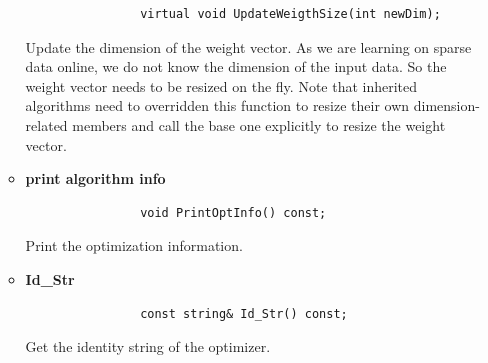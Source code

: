 \documentclass[11pt,a4paper]{article}
\newlength{\wideitemsep}
\let\olditem\item
\renewcommand{\item}{\setlength{\itemsep}{\wideitemsep}\olditem}
\begin{document}
\begin{enumerate}
\begin{itemize}
                \lstset{language=C++}
                \begin{lstlisting}
                virtual void UpdateWeigthSize(int newDim);
                \end{lstlisting}

                Update the dimension of the weight vector. As we are learning
                on sparse data online, we do not know the dimension of the
                input data. So the weight vector needs to be resized on the
                fly. Note that inherited algorithms need to overridden this
                function to resize their own dimension-related members and call
                the base one explicitly to resize the weight vector.

            \item \textbf{print algorithm info}

                \lstset{language=C++}
                \begin{lstlisting}
                void PrintOptInfo() const;
                \end{lstlisting}

                Print the optimization information.

            \item \textbf{Id\_Str}

                \lstset{language=C++}
                \begin{lstlisting}
                const string& Id_Str() const;
                \end{lstlisting}

                Get the identity string of the optimizer.
        \end{itemize}

\end{enumerate}
\end{document}
